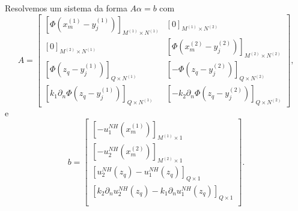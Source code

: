 \documentclass[portuguese,notheorems]{beamer}
\begin{document}
\begin{frame}
    Resolvemos um sistema da forma \(A \alpha = b\) com
    \footnotesize\begin{equation*}
        A = \begin{bmatrix}
            \left[\Phi\left(x^{(1)}_{m}-y_j^{(1)}\right)\right]_{M^{(1)}\times N^{(1)}} & [0]_{M^{(1)}\times N^{(2)}} \\
            [0]_{M^{(2)}\times N^{(1)}} & \left[\Phi\left(x^{(2)}_{m}-y_j^{(2)}\right)\right]_{M^{(2)}\times N^{(2)}} \\
            \left[\Phi\left(z_q-y_j^{(1)}\right)\right]_{Q\times N^{(1)}} & \left[-\Phi\left(z_q-y_j^{(2)}\right)\right]_{Q\times N^{(2)}} \\
            \left[k_1\partial_n \Phi\left(z_q-y_j^{(1)}\right)\right]_{Q\times N^{(1)}} & \left[-k_2 \partial_n \Phi\left(z_q-y_j^{(2)}\right)\right]_{Q\times N^{(2)}}
        \end{bmatrix},
    \end{equation*}\normalsize
    e
    \footnotesize \begin{equation*}
        b = \begin{bmatrix}
        \left[-u_1^{NH}(x^{(1)}_{m})\right]_{M^{(1)}\times 1}\\
        \left[-u_2^{NH}(x^{(2)}_{m})\right]_{M^{(2)}\times 1}\\
        \left[u_2^{NH}(z_q)-u_1^{NH}(z_q)\right]_{Q\times 1}\\
        \left[k_2 \partial_n u_2^{NH}(z_q)- k_1 \partial_n u_1^{NH}(z_q)\right]_{Q\times 1}\\
    \end{bmatrix}.
\end{equation*}\normalsize
\end{frame}
\end{document}

